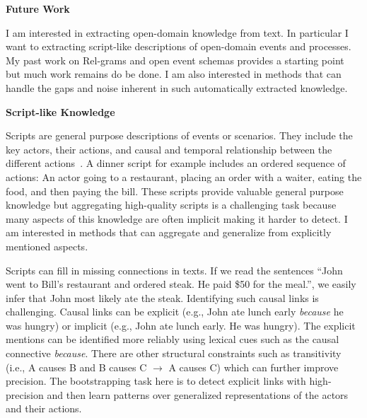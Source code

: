 \documentclass[a4paper,11pt,onecolumn]{article}
\begin{document}
{\bf Future Work}

I am interested in extracting open-domain knowledge from text. In particular I want to extracting script-like descriptions of open-domain events and processes. My past work on Rel-grams and open event schemas provides a starting point but much work remains do be done. I am also interested in methods that can handle the gaps and noise inherent in such automatically extracted knowledge.

{\bf Script-like Knowledge}

Scripts are general purpose descriptions of events or scenarios. They include the key actors, their actions, and causal and temporal relationship between the different actions~\cite{schank-scripts75}. A dinner script for example includes an ordered sequence of actions: An actor going to a restaurant, placing an order with a waiter, eating the food, and then paying the bill. These scripts provide valuable general purpose knowledge but aggregating high-quality scripts is a challenging task because many aspects of this knowledge are often implicit making it harder to detect. I am interested in methods that can aggregate and generalize from explicitly mentioned aspects. %

Scripts can fill in missing connections in texts. If we read the sentences ``John went to Bill's restaurant and ordered steak. He paid \$50 for the meal.'', we easily infer that John most likely ate the steak. Identifying such causal links is challenging. Causal links can be explicit (e.g., John ate lunch early {\em because} he was hungry) or implicit (e.g., John ate lunch early. He was hungry). The explicit mentions can be identified more reliably using lexical cues such as the causal connective {\em because}. There are other structural constraints such as transitivity (i.e., A causes B and B causes C $\rightarrow$ A causes C) which can further improve precision. The bootstrapping task here is to detect explicit links with high-precision and then learn patterns over generalized representations of the actors and their actions. 
\end{document}
